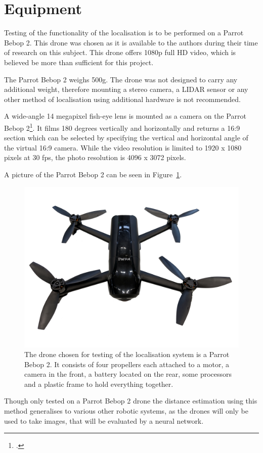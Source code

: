 \section{Equipment}
Testing of the functionality of the localisation is to be performed on a Parrot Bebop 2. This drone was chosen as it is available to the authors during their time of research on this subject. This drone offers 1080p full HD video, which is believed be more than sufficient for this project.

The Parrot Bebop 2 weighs 500g. The drone was not designed to carry any additional weight, therefore mounting a stereo camera, a LIDAR sensor or any other method of localisation using additional hardware is not recommended.

A wide-angle 14 megapixel fish-eye lens is mounted as a camera on the Parrot Bebop 2\footcite{parrotBebop2}. It films 180 degrees vertically and horizontally and returns a 16:9 section which can be selected by specifying the vertical and horizontal angle of the virtual 16:9 camera. While the video resolution is limited to 1920 x 1080 pixels at 30 fps, the photo resolution is 4096 x 3072 pixels.

A picture of the Parrot Bebop 2 can be seen in Figure~\ref{pic:introduction_equipment_parrotBebop2}.

\begin{figure}[h]
	\centering
	\includegraphics[width=5.5in]{img/introduction_equipment_parrotBebop2.jpg}
	\caption{The drone chosen for testing of the localisation system is a Parrot Bebop 2. It consists of four propellers each attached to a motor, a camera in the front, a battery located on the rear, some processors and a plastic frame to hold everything together.}
	\label{pic:introduction_equipment_parrotBebop2}
\end{figure}

Though only tested on a Parrot Bebop 2 drone the distance estimation using this method generalises to various other robotic systems, as the drones will only be used to take images, that will be evaluated by a neural network.

\filbreak
